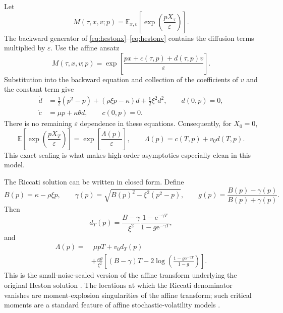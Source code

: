 \documentclass[11pt]{article}
\newcommand{\E}{\mathbb E}
\newcommand{\e}{\mathrm e}
\begin{document}
Let
\begin{equation}
 M(\tau,x,v;p)=\E_{x,v}\left[\exp\left(\frac{pX_\tau}{\varepsilon}\right)\right].
\end{equation}
The backward generator of \eqref{eq:hestonx}--\eqref{eq:hestonv} contains the diffusion terms multiplied by $\varepsilon$. Use the affine ansatz
\begin{equation}
 M(\tau,x,v;p)=
 \exp\left[\frac{px+c(\tau,p)+d(\tau,p)v}{\varepsilon}\right].
 \label{eq:affineansatz}
\end{equation}
Substitution into the backward equation and collection of the coefficients of $v$ and the constant term give
\begin{align}
 \dot d&=\frac12(p^2-p)+(\rho\xi p-\kappa)d+\frac12\xi^2d^2,
 \qquad d(0,p)=0,\label{eq:riccati}\\
 \dot c&=\mu p+\kappa\theta d,
 \qquad c(0,p)=0.\label{eq:cRiccati}
\end{align}
There is no remaining $\varepsilon$ dependence in these equations. Consequently, for $X_0=0$,
\begin{equation}
 \boxed{
 \E\left[\exp\left(\frac{pX_T}{\varepsilon}\right)\right]
 =\exp\left[\frac{\Lambda(p)}{\varepsilon}\right]},
 \qquad
 \Lambda(p)=c(T,p)+v_0d(T,p).
 \label{eq:scaledtransform}
\end{equation}
This exact scaling is what makes high-order asymptotics especially clean in this model.

The Riccati solution can be written in closed form. Define
\begin{equation}
 B(p)=\kappa-\rho\xi p,
 \qquad
 \gamma(p)=\sqrt{B(p)^2-\xi^2(p^2-p)},
 \qquad
 g(p)=\frac{B(p)-\gamma(p)}{B(p)+\gamma(p)}.
\end{equation}
Then
\begin{equation}
 d_T(p)=\frac{B-\gamma}{\xi^2}
 \frac{1-\e^{-\gamma T}}{1-g\e^{-\gamma T}},
 \label{eq:dclosed}
\end{equation}
and
\begin{align}
 \Lambda(p)=&\;\mu pT+v_0d_T(p)\nonumber\\
 &+\frac{\kappa\theta}{\xi^2}
 \left[(B-\gamma)T-2\log\left(\frac{1-g\e^{-\gamma T}}{1-g}\right)\right].
 \label{eq:Lambdaclosed}
\end{align}
This is the small-noise-scaled version of the affine transform underlying the original Heston solution \citep{heston1993}. The locations at which the Riccati denominator vanishes are moment-explosion singularities of the affine transform; such critical moments are a standard feature of affine stochastic-volatility models \citep{kellerressel2011}.
\end{document}
